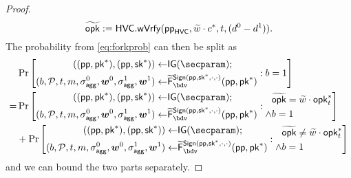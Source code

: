 \begin{proof}
\[%
%  
    \widetilde\opk :=  \hvc.\wverify(\params_\hvc,\widetilde w\cdot c^* ,t,(d^0-d^1)).
  \]
  The probability from \autoref{eq:forkprob} can then be split as
  \begin{equation}
  \begin{aligned}
    &\Pr\left[\begin{aligned}((\params,\pk^*),(\params,\sk^*)) \gets& \IG(\secparam);\\ (b,\pubkeys,t,m,\aggsig^0,\vec{w}^0,\aggsig^1,\vec{w}^1)\gets& \widetilde\fork^{\sign(\params,\sk^*,\cdot,\cdot)}_\bdv(\params,\pk^*)\end{aligned} : b=1 \right]\\
    =&\Pr\left[\begin{aligned}((\params,\pk^*),(\params,\sk^*)) \gets& \IG(\secparam);\\ (b,\pubkeys,t,m,\aggsig^0,\vec{w}^0,\aggsig^1,\vec{w}^1)\gets& \widetilde\fork^{\sign(\params,\sk^*,\cdot,\cdot)}_\bdv(\params,\pk^*)\end{aligned} : \begin{aligned} &\widetilde\opk = \widetilde w \cdot \opk^*_{t} \\ \land& b=1\end{aligned}\right]\\%
    &+\Pr\left[\begin{aligned}((\params,\pk^*),(\params,\sk^*)) \gets& \IG(\secparam);\\ (b,\pubkeys,t,m,\aggsig^0,\vec{w}^0,\aggsig^1,\vec{w}^1)\gets& \widetilde\fork^{\sign(\params,\sk^*,\cdot,\cdot)}_\bdv(\params,\pk^*)\end{aligned} :\begin{aligned} &\widetilde\opk \neq \widetilde w \cdot \opk^*_{t} \\ \land& b=1\end{aligned}\right]%
  \end{aligned}
  \end{equation}
  and we can bound the two parts separately.
  

\end{proof}
